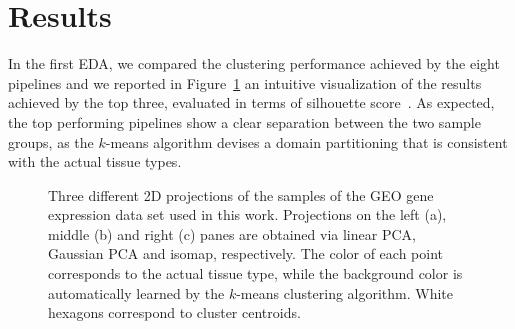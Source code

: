 \section{Results} \label{sec:results}

In the first EDA, we compared the clustering performance achieved by the eight \ade pipelines and we reported in Figure~\ref{fig:scatter} an intuitive visualization of the results achieved by the top three, evaluated in terms of silhouette score~\cite{rousseeuw1987silhouettes}. As expected, the top performing pipelines show a clear separation between the two sample groups, as the $k$-means algorithm devises a domain partitioning that is consistent with the actual tissue types.

\begin{figure}[!ht]
    \centering
    \hfill%
    \hfill%
    \caption{Three different 2D projections of the samples of the GEO gene expression data set used in this work. Projections on the left (a), middle (b) and right (c) panes are obtained via linear PCA, Gaussian PCA and isomap, respectively. The color of each point corresponds to the actual tissue type, while the background color is automatically learned by the $k$-means clustering algorithm. White hexagons correspond to cluster centroids.}\label{fig:scatter}
\end{figure}

